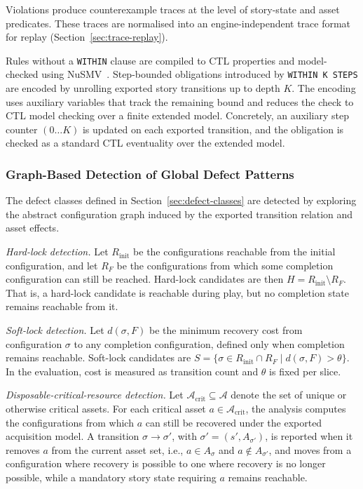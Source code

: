 \documentclass[conference]{IEEEtran}
\newcommand{\Assets}{\mathcal{A}}
\begin{document}
Violations produce counterexample traces at the level of story-state and
asset predicates. These traces are normalised into an engine-independent
trace format for replay (Section~\ref{sec:trace-replay}).

Rules without a \texttt{WITHIN} clause are compiled to CTL properties and
model-checked using NuSMV~\cite{CimattiCGGPRST02}. Step-bounded
obligations introduced by \texttt{WITHIN K STEPS} are encoded by
unrolling exported story transitions up to depth $K$. The encoding uses
auxiliary variables that track the remaining bound and reduces the check
to CTL model checking over a finite extended model. Concretely, an
auxiliary step counter $(0\dots K)$ is updated on each exported
transition, and the obligation is checked as a standard CTL eventuality
over the extended model.

\subsubsection{Graph-Based Detection of Global Defect Patterns}

The defect classes defined in Section~\ref{sec:defect-classes} are
detected by exploring the abstract configuration graph induced by the
exported transition relation and asset effects.

\noindent\emph{Hard-lock detection.}
Let $R_{\mathrm{init}}$ be the configurations reachable from the initial
configuration, and let $R_F$ be the configurations from which some
completion configuration can still be reached. Hard-lock candidates are
then $H = R_{\mathrm{init}} \setminus R_F$.
That is, a hard-lock candidate is reachable during play, but no completion
state remains reachable from it.

\noindent\emph{Soft-lock detection.}
Let $d(\sigma,F)$ be the minimum recovery cost from configuration
$\sigma$ to any completion configuration, defined only when completion
remains reachable. Soft-lock candidates are
$S = \{ \sigma \in R_{\mathrm{init}} \cap R_F \mid d(\sigma,F) > \theta \}$.
In the evaluation, cost is measured as transition count and $\theta$ is fixed per slice.

\noindent\emph{Disposable-critical-resource detection.}
Let $\Assets_{\mathrm{crit}} \subseteq \Assets$ denote the set of unique
or otherwise critical assets. For each critical asset
$a \in \Assets_{\mathrm{crit}}$, the analysis computes the configurations
from which $a$ can still be recovered under the exported acquisition
model. A transition $\sigma \rightarrow \sigma'$, with
$\sigma'=(s',A_{\sigma'})$, is reported when it removes $a$ from the
current asset set, i.e., $a \in A_\sigma$ and $a \notin A_{\sigma'}$,
and moves from a configuration where recovery is possible to one where
recovery is no longer possible, while a mandatory story state requiring
$a$ remains reachable.
\end{document}
